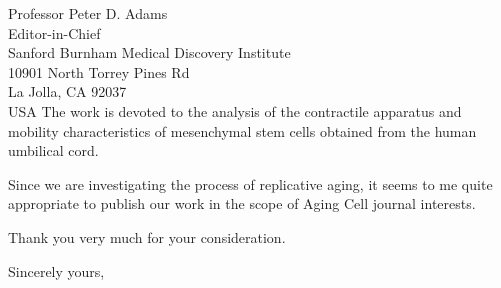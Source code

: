\documentclass[11pt]{letter} %
\begin{document}
\begin{letter}{
Professor Peter D. Adams \\
Editor-in-Chief \\
Sanford Burnham Medical Discovery Institute \\
10901 North Torrey Pines Rd \\
La Jolla, CA 92037 \\
USA}
The work is devoted to the analysis of the contractile apparatus and mobility characteristics of mesenchymal stem cells obtained from the human umbilical cord.

Since we are investigating the process of replicative aging, it seems to me quite appropriate to publish our work in the scope of Aging Cell journal interests.

Thank you very much for your consideration.

\closing{Sincerely yours, }




\end{letter}
\end{document}
